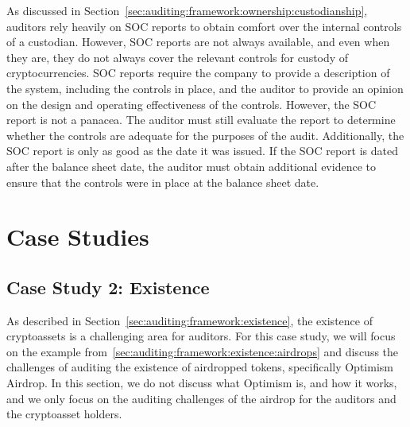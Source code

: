 As discussed in Section~\ref{sec:auditing:framework:ownership:custodianship}, auditors rely heavily on SOC reports to obtain comfort over the internal controls of a custodian. However, SOC reports are not always available, and even when they are, they do not always cover the relevant controls for custody of cryptocurrencies. SOC reports require the company to provide a description of the system, including the controls in place, and the auditor to provide an opinion on the design and operating effectiveness of the controls. However, the SOC report is not a panacea. The auditor must still evaluate the report to determine whether the controls are adequate for the purposes of the audit. Additionally, the SOC report is only as good as the date it was issued. If the SOC report is dated after the balance sheet date, the auditor must obtain additional evidence to ensure that the controls were in place at the balance sheet date.




\section{Case Studies} \label{sec:auditing:case-studies}










\subsection{Case Study 2: Existence} \label{sec:auditing:case-studies:existence}
As described in Section~\ref{sec:auditing:framework:existence}, the existence of cryptoassets is a challenging area for auditors. For this case study, we will focus on the example from~\ref{sec:auditing:framework:existence:airdrops} and discuss the challenges of auditing the existence of airdropped tokens, specifically Optimism~\cite{optimismgithub} Airdrop. In this section, we do not discuss what Optimism is, and how it works, and we only focus on the auditing challenges of the airdrop for the auditors and the cryptoasset holders.

